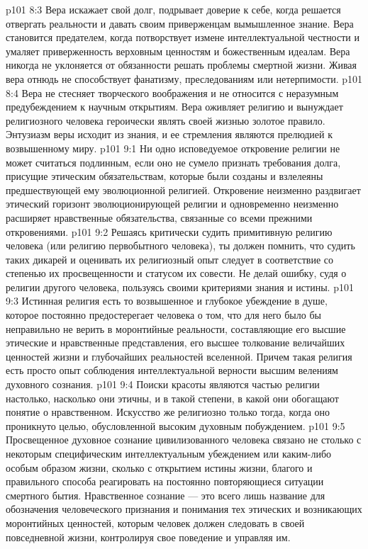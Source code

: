 \vs p101 8:3 Вера искажает свой долг, подрывает доверие к себе, когда решается отвергать реальности и давать своим приверженцам вымышленное знание. Вера становится предателем, когда потворствует измене интеллектуальной честности и умаляет приверженность верховным ценностям и божественным идеалам. Вера никогда не уклоняется от обязанности решать проблемы смертной жизни. Живая вера отнюдь не способствует фанатизму, преследованиям или нетерпимости.
\vs p101 8:4 Вера не стесняет творческого воображения и не относится с неразумным предубеждением к научным открытиям. Вера оживляет религию и вынуждает религиозного человека героически являть своей жизнью золотое правило. Энтузиазм веры исходит из знания, и ее стремления являются прелюдией к возвышенному миру.
\vs p101 9:1 Ни одно исповедуемое откровение религии не может считаться подлинным, если оно не сумело признать требования долга, присущие этическим обязательствам, которые были созданы и взлелеяны предшествующей ему эволюционной религией. Откровение неизменно раздвигает этический горизонт эволюционирующей религии и одновременно неизменно расширяет нравственные обязательства, связанные со всеми прежними откровениями.
\vs p101 9:2 Решаясь критически судить примитивную религию человека (или религию первобытного человека), ты должен помнить, что судить таких дикарей и оценивать их религиозный опыт следует в соответствие со степенью их просвещенности и статусом их совести. Не делай ошибку, судя о религии другого человека, пользуясь своими критериями знания и истины.
\vs p101 9:3 Истинная религия есть то возвышенное и глубокое убеждение в душе, которое постоянно предостерегает человека о том, что для него было бы неправильно не верить в моронтийные реальности, составляющие его высшие этические и нравственные представления, его высшее толкование величайших ценностей жизни и глубочайших реальностей вселенной. Причем такая религия есть просто опыт соблюдения интеллектуальной верности высшим велениям духовного сознания.
\vs p101 9:4 Поиски красоты являются частью религии настолько, насколько они этичны, и в такой степени, в какой они обогащают понятие о нравственном. Искусство же религиозно только тогда, когда оно проникнуто целью, обусловленной высоким духовным побуждением.
\vs p101 9:5 Просвещенное духовное сознание цивилизованного человека связано не столько с некоторым специфическим интеллектуальным убеждением или каким\hyp{}либо особым образом жизни, сколько с открытием истины жизни, благого и правильного способа реагировать на постоянно повторяющиеся ситуации смертного бытия. Нравственное сознание --- это всего лишь название для обозначения человеческого признания и понимания тех этических и возникающих моронтийных ценностей, которым человек должен следовать в своей повседневной жизни, контролируя свое поведение и управляя им.
